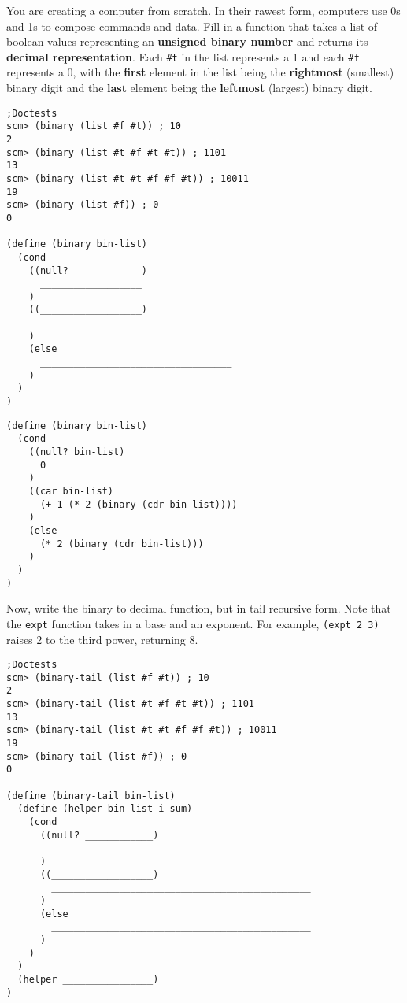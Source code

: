 \begin{blocksection}
\question
You are creating a computer from scratch. In their rawest form, computers use 0s and 1s to compose commands and data. Fill in a function that takes a list of boolean values representing an \textbf{unsigned binary number} and returns its \textbf{decimal representation}. Each \lstinline{#t} in the list represents a 1 and each \lstinline{#f} represents a 0, with the \textbf{first} element in the list being the \textbf{rightmost} (smallest) binary digit and the \textbf{last} element being the \textbf{leftmost} (largest) binary digit.
\\
\begin{lstlisting}
;Doctests
scm> (binary (list #f #t)) ; 10
2
scm> (binary (list #t #f #t #t)) ; 1101
13
scm> (binary (list #t #t #f #f #t)) ; 10011
19
scm> (binary (list #f)) ; 0
0

(define (binary bin-list)
  (cond
    ((null? ____________)
      __________________
    )
    ((__________________)
      __________________________________
    )
    (else
      __________________________________
    )
  )
)
\end{lstlisting}
\end{blocksection}

\begin{solution}
\begin{blocksection}
\begin{lstlisting}
(define (binary bin-list)
  (cond
    ((null? bin-list)
      0
    )
    ((car bin-list)
      (+ 1 (* 2 (binary (cdr bin-list))))
    )
    (else
      (* 2 (binary (cdr bin-list)))
    )
  )
)
\end{lstlisting}
\end{blocksection}
\end{solution}


\begin{blocksection}
\question
Now, write the binary to decimal function, but in tail recursive form. Note that the \lstinline{expt} function takes in a base and an exponent. For example, \lstinline{(expt 2 3)} raises 2 to the third power, returning 8.
\\
\begin{lstlisting}
;Doctests
scm> (binary-tail (list #f #t)) ; 10
2
scm> (binary-tail (list #t #f #t #t)) ; 1101
13
scm> (binary-tail (list #t #t #f #f #t)) ; 10011
19
scm> (binary-tail (list #f)) ; 0
0

(define (binary-tail bin-list)
  (define (helper bin-list i sum)
    (cond
      ((null? ____________)
        __________________
      )
      ((__________________)
        ______________________________________________
      )
      (else
        ______________________________________________
      )
    )
  )
  (helper ________________)
)
\end{lstlisting}
\end{blocksection}

